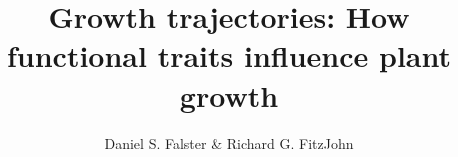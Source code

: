 
\usepackage[rgb,dvipsnames]{xcolor}

\newcommand{\smurl}[1]{\url{#1}}
\newcommand{\ud}{\ensuremath{\rm{d}}}
\newcommand{\tabitem}{~~\llap{\textbullet}~~}
\newcommand{\email}[1]{\href{mailto:#1}{\texttt{#1}}}
\newcommand{\plant}{\texttt{plant}}


\title{Growth trajectories: How functional traits influence plant growth}

\author{Daniel S. Falster\textsuperscript{\textasteriskcentered} \& Richard G. FitzJohn}

\usepackage{natbib}

\usepackage{etoolbox}


\usepackage{graphicx}
\graphicspath{{../output/}}

\let\Oldincludegraphics\includegraphics
\renewcommand{\includegraphics}[1]{\Oldincludegraphics[width=15cm,height=21cm,keepaspectratio]{#1}}
